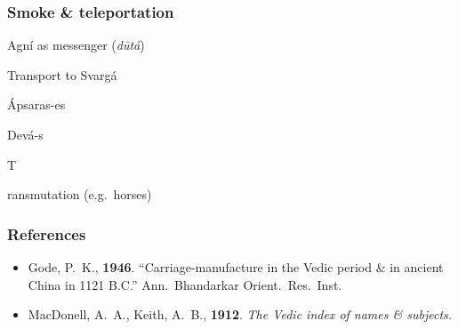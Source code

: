 \documentclass[pdf]{beamer}
\newcommand{\Subitem}[1]{{\setlength\itemindent{12pt} \item[-] #1}}
\begin{document}
\begin{frame} \frametitle{Smoke \& teleportation}
\begin{itemize}
	\item Agní as messenger (\textit{dūtá})
	\item Transport to Svargá
	\item Ápsaras-es
	\item Devá-s
	\Subitem Transmutation (e.g.~horses)
\end{itemize}
\end{frame}

\begin{frame} \frametitle{References}
\begin{itemize}
	\item Gode, P.~K., \textbf{1946}. ``Carriage-manufacture in the Vedic period \& in ancient China in 1121 B.C.'' Ann.~Bhandarkar Orient.~Res.~Inst.
	\item MacDonell, A.~A., Keith, A.~B., \textbf{1912}. \textit{The Vedic index of names \& subjects.}
\end{itemize}
\end{frame}
\end{document}
